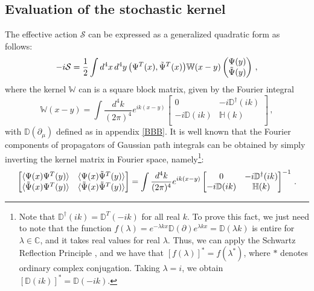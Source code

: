 \documentclass[a4paper, amsfonts, amssymb, amsmath, reprint, showkeys, nofootinbib, twoside,notitlepage,onecolumn]{revtex4-2}
\newcommand{\Da}{{\mathbb{D}}}
\newcommand{\Ha}{{\mathbb{H}}}
\theoremstyle{definition}
\begin{document}
\subsection{Evaluation of the stochastic kernel}\label{BBB2}

The effective action $\mathcal{S}$ can be expressed as a generalized quadratic form as follows:
\begin{equation}
    -i\mathcal{S} = \dfrac{1}{2} \int d^4 x \, d^4 y \, \big(\Psi^T(x),\Tilde{\Psi}^T(x) \big) \mathbb{W}(x-y) \begin{pmatrix}
        \Psi(y) \\
        \Tilde{\Psi}(y) \\
    \end{pmatrix} \, ,
\end{equation}
where the kernel $\mathbb{W}$ can is a square block matrix, given by the Fourier integral
\begin{equation}
    \mathbb{W}(x-y)=\int \dfrac{d^4 k}{(2\pi)^4} e^{ik(x-y)} \begin{bmatrix}
        0 & -i\Da^\dagger(ik) \\
        -i\Da(ik) & \Ha(k) \\
    \end{bmatrix} \, ,
\end{equation}
with $\Da(\partial_\mu)$ defined as in appendix \ref{BBB}. It is well known that the Fourier components of propagators of Gaussian path integrals can be obtained by simply inverting the kernel matrix in Fourier space, namely\footnote{Note that $\Da^\dagger(ik)=\Da^T(-ik)$ for all real $k$. To prove this fact, we just need to note that the function $f(\lambda)=e^{-\lambda kx}\Da(\partial)e^{\lambda kx}=\Da(\lambda k)$ is entire for $\lambda \in \mathbb{C}$, and it takes real values for real $\lambda$. Thus, we can apply the Schwartz Reflection Principle \cite{NeedhamVisualComplexAnalysis}, and we have that $[f(\lambda)]^*=f(\lambda^*)$, where $*$ denotes ordinary complex conjugation. Taking $\lambda=i$, we obtain $[\Da(i k)]^*=\Da(-i k)$.}:
\begin{equation}\label{amoinvertiere}
    \begin{bmatrix}
        \langle \Psi(x)\Psi^T(y) \rangle & \langle \Psi(x)\Tilde{\Psi}^T(y) \rangle  \\
        \langle \Tilde{\Psi}(x)\Psi^T(y) \rangle  &  \langle \Tilde{\Psi}(x)\Tilde{\Psi}^T(y) \rangle \\
    \end{bmatrix}=\int \dfrac{d^4 k}{(2\pi)^4} e^{ik(x-y)} \begin{bmatrix}
        0 & -i\Da^\dagger(ik) \\
        -i\Da(ik) & \Ha(k) \\
    \end{bmatrix}^{-1} \, .
\end{equation}
\end{document}
